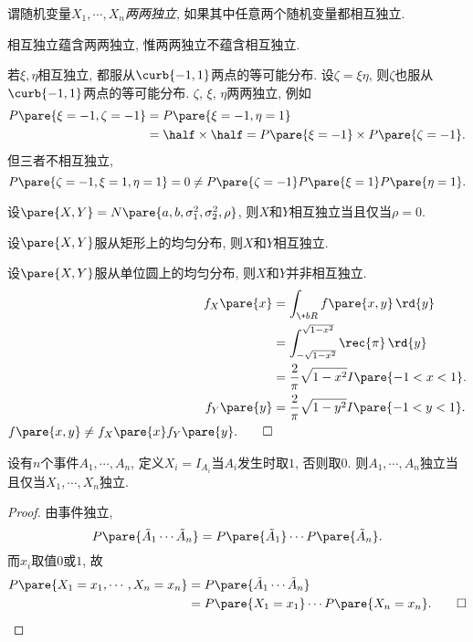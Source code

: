 \documentclass{ctexart}
\begin{document}
谓随机变量$X_1,\cdots,X_n$\emph{两两独立}, 如果其中任意两个随机变量都相互独立.
\begin{pitfall}
    相互独立蕴含两两独立, 惟两两独立不蕴含相互独立.
\end{pitfall}
\begin{sample}
    \begin{ex}
        若$\xi,\eta$相互独立, 都服从$\curb{-1,1}$两点的等可能分布. 设$\zeta = \xi\eta$, 则$\zeta$也服从$\curb{-1,1}$两点的等可能分布. $\zeta$, $\xi$, $\eta$两两独立, 例如
        \begin{align*}
            P\pare{\xi = -1, \zeta = -1} &= P\pare{\xi=-1, \eta = 1}\\ &= \half\times\half = P\pare{\xi = -1}\times P\pare{\zeta = -1}. 
        \end{align*}
        但三者不相互独立,
        \[ P\pare{\zeta = -1, \xi = 1, \eta = 1} = 0 \neq P\pare{\zeta = -1}P\pare{\xi = 1}P\pare{\eta = 1}. \]
    \end{ex}
\end{sample}
\begin{sample}
    \begin{ex}
        设$\pare{X,Y} = N\pare{a,b,\sigma_1^2,\sigma_2^2,\rho}$, 则$X$和$Y$相互独立当且仅当$\rho = 0$.
    \end{ex}
    \begin{ex}
        设$\pare{X,Y}$服从矩形上的均匀分布, 则$X$和$Y$相互独立.
    \end{ex}
    \begin{ex}
        设$\pare{X,Y}$服从单位圆上的均匀分布, 则$X$和$Y$并非相互独立.
        \begin{align*}
            f_X\pare{x} &= \int_{\+bR} f\pare{x,y}\,\rd{y} \\
            &= \int_{-\sqrt{1-x^2}}^{\sqrt{1-x^2}} \rec{\pi}\,\rd{y} \\
            &= \frac{2}{\pi} \sqrt{1-x^2} I\pare{-1<x<1}. \\
            f_Y\pare{y} &= \frac{2}{\pi} \sqrt{1-y^2} I\pare{-1<y<1}. \\
            f\pare{x,y}\neq f_X\pare{x}f_Y\pare{y}.\qedhere
        \end{align*}
    \end{ex}
    \begin{ex}
        设有$n$个事件$A_1,\cdots,A_n$, 定义$X_i = I_{A_i}$当$A_i$发生时取$1$, 否则取$0$. 则$A_1,\cdots,A_n$独立当且仅当$X_1,\cdots,X_n$独立.
    \end{ex}
    \begin{proof}
        由事件独立,
        \[ P\pare{\tilde{A}_1\cdots\tilde{A}_n} = P\pare{\tilde{A}_1}\cdots P\pare{\tilde{A}_n}. \]
        而$x_i$取值$0$或$1$, 故
        \begin{align*}
            P\pare{X_1=x_1, \cdots, X_n=x_n} &= P\pare{\tilde{A}_1\cdots\tilde{A}_n}\\ &= P\pare{X_1=x_1}\cdots P\pare{X_n=x_n}.\qedhere
        \end{align*}
    \end{proof}
\end{sample}
\end{document}

